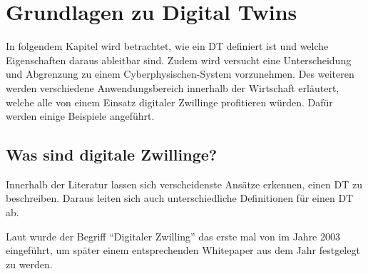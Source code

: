 \chapter{Grundlagen zu Digital Twins}

In folgendem Kapitel wird betrachtet, wie ein \ac{DT} definiert ist und welche Eigenschaften daraus ableitbar sind. Zudem wird versucht eine Unterscheidung und Abgrenzung zu einem Cyberphysischen-System vorzunehmen. Des weiteren werden verschiedene Anwendungsbereich innerhalb der Wirtschaft erläutert, welche alle von einem Einsatz digitaler Zwillinge profitieren würden. Dafür werden einige Beispiele angeführt.

\section{Was sind digitale Zwillinge?}

Innerhalb der Literatur lassen sich verscheidenste Ansätze erkennen, einen \ac{DT} zu beschreiben. Daraus leiten sich auch unterschiedliche Definitionen für einen \ac{DT} ab.

Laut \citeauthor{fuller2020digital} wurde der Begriff \enquote{Digitaler Zwilling} das erste mal von \citeauthor{grieves2014digital} im Jahre 2003 eingeführt, um später einem entsprechenden Whitepaper  aus dem Jahr \citeyear{grieves2014digital} festgelegt zu werden.\autocite{fuller2020digital}

